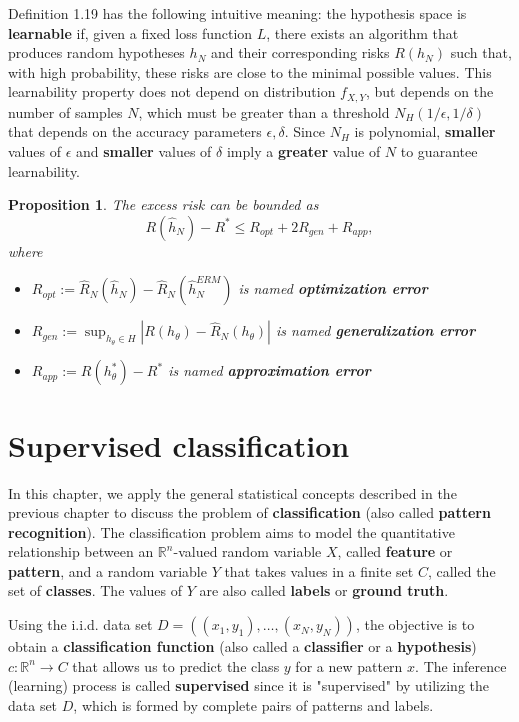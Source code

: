 \documentclass{report}
\newtheorem{proposition}{Proposition}[chapter]
\begin{document}
Definition 1.19 has the following intuitive meaning: the hypothesis space is \textbf{learnable} if, given a fixed loss function $L$, there exists an algorithm that produces random hypotheses $h_N$ and their corresponding risks $R(h_N)$ such that, with high probability, these risks are close to the minimal possible values. This learnability property does not depend on distribution $f_{X,Y}$, but depends on the number of samples $N$, which must be greater than a threshold $N_H(1/\epsilon,1/\delta)$ that depends on the accuracy parameters $\epsilon,\delta$. Since $N_H$ is polynomial, \textbf{smaller} values of $\epsilon$ and \textbf{smaller} values of $\delta$ imply a \textbf{greater} value of $N$ to guarantee learnability.

\begin{proposition}
The excess risk can be bounded as
\begin{equation}
 R(\hat{h}_N)-R^* \leq R_{opt} + 2R_{gen} + R_{app},
\end{equation}
where
\begin{itemize}
\item $R_{opt} := \hat{R}_N(\hat{h}_N)-\hat{R}_N(\hat{h}^{ERM}_N)$ is named \textbf{optimization error}
\item $R_{gen} := \sup_{h_{\theta} \in H}|R(h_\theta)-\hat{R}_N(h_\theta)|$ is named \textbf{generalization error}
\item $R_{app} := R(h^*_\theta)-R^*$ is named \textbf{approximation error}
\end{itemize}
\end{proposition}

\chapter{Supervised classification}
In this chapter, we apply the general statistical concepts described in the previous chapter to discuss the problem of \textbf{classification} (also called \textbf{pattern recognition}). The classification problem aims to model the quantitative relationship between an $\mathbb{R}^n$-valued random variable $X$, called \textbf{feature} or \textbf{pattern}, and a random variable $Y$ that takes values in a finite set $C$, called the set of \textbf{classes}. The values of $Y$ are also called \textbf{labels} or \textbf{ground truth}.

Using the i.i.d. data set $D = ((x_1,y_1),\dots,(x_N,y_N))$, the objective is to obtain a \textbf{classification function} (also called a \textbf{classifier} or a \textbf{hypothesis}) $c : \mathbb{R}^n \to C$ that allows us to predict the class $y$ for a new pattern $x$. The inference (learning) process is called \textbf{supervised} since it is "supervised" by utilizing the data set $D$, which is formed by complete pairs of patterns and labels.
\end{document}
